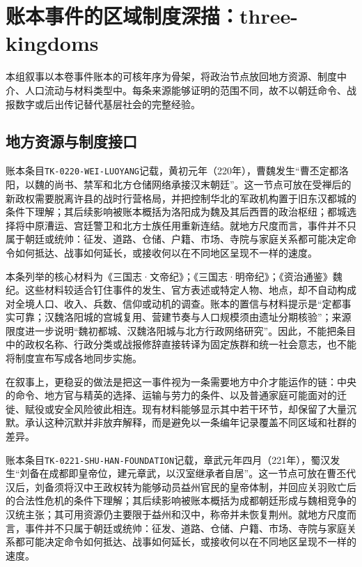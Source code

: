\section{账本事件的区域制度深描：three-kingdoms}

\label{sec:ledger-depth-three-kingdoms}

本组叙事以本卷事件账本的可核年序为骨架，将政治节点放回地方资源、制度中介、人口流动与材料类型中。每条来源能够证明的范围不同，故不以朝廷命令、战报数字或后出传记替代基层社会的完整经验。

\subsection{地方资源与制度接口}

账本条目\texttt{TK-0220-WEI-LUOYANG}记载，黄初元年（220年），曹魏发生“曹丕定都洛阳，以魏的尚书、禁军和北方仓储网络承接汉末朝廷”。这一节点可放在受禅后的新政权需要脱离许县的战时行营格局，并把控制华北的军政机构置于旧东汉都城的条件下理解；其后续影响被账本概括为洛阳成为魏及其后西晋的政治枢纽；都城选择将中原漕运、宫廷警卫和北方士族任用重新连结。就地方尺度而言，事件并不只属于朝廷或统帅：征发、道路、仓储、户籍、市场、寺院与家庭关系都可能决定命令如何抵达、战事如何延长，或接收何以在不同地区呈现不一样的速度。

本条列举的核心材料为《三国志·文帝纪》；《三国志·明帝纪》；《资治通鉴》魏纪。这些材料较适合钉住事件的发生、官方表述或特定人物、地点，却不自动构成对全境人口、收入、兵数、信仰或动机的调查。账本的置信与材料提示是“定都事实可靠；汉魏洛阳城的宫城复用、营建节奏与人口规模须由遗址分期核验”；来源限度进一步说明“魏初都城、汉魏洛阳城与北方行政网络研究”。因此，不能把条目中的政权名称、行政分类或战报修辞直接转译为固定族群和统一社会意志，也不能将制度宣布写成各地同步实施。

在叙事上，更稳妥的做法是把这一事件视为一条需要地方中介才能运作的链：中央的命令、地方官与精英的选择、运输与劳力的条件、以及普通家庭可能面对的迁徙、赋役或安全风险彼此相连。现有材料能够显示其中若干环节，却保留了大量沉默。承认这种沉默并非放弃解释，而是避免以一条编年记录覆盖不同区域和社群的差异。

账本条目\texttt{TK-0221-SHU-HAN-FOUNDATION}记载，章武元年四月（221年），蜀汉发生“刘备在成都即皇帝位，建元章武，以汉室继承者自居”。这一节点可放在曹丕代汉后，刘备须将汉中王政权转为能够动员益州官民的皇帝体制，并回应关羽败亡后的合法性危机的条件下理解；其后续影响被账本概括为成都朝廷形成与魏相竞争的汉统主张；其可用资源仍主要限于益州和汉中，称帝并未恢复荆州。就地方尺度而言，事件并不只属于朝廷或统帅：征发、道路、仓储、户籍、市场、寺院与家庭关系都可能决定命令如何抵达、战事如何延长，或接收何以在不同地区呈现不一样的速度。

